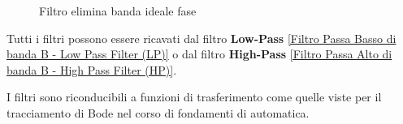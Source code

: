             \begin{figure}[H]
                \centering
                \caption{Filtro elimina banda ideale fase}
                \label{fig:BS filter phase}
            \end{figure} 
            Tutti i filtri possono essere ricavati dal filtro \textbf{Low-Pass} \ref{Filtro Passa Basso di banda B - Low Pass Filter (LP)}
            o dal filtro \textbf{High-Pass} \ref{Filtro Passa Alto di banda B - High Pass Filter (HP)}.

            I filtri sono riconducibili a funzioni di trasferimento come quelle viste per il tracciamento di Bode nel corso
            di fondamenti di automatica.
